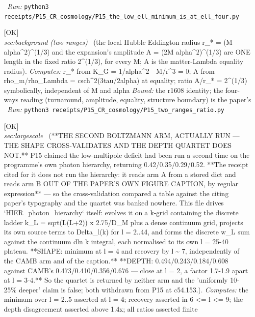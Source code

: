 \begin{description}
\ \emph{Run:} \texttt{python3 receipts/P15\_CR\_cosmology/P15\_the\_low\_ell\_minimum\_is\_at\_ell\_four.py}
\item[\label{rcpt:P15_two_ranges_ratio}\texttt{P15\_two\_ranges\_ratio}]\hfill\textsf{[OK]}\\
\textit{sec:background (two ranges)} \ (the local Hubble-Eddington radius r\_* = (M alpha\textasciicircum{}2)\textasciicircum{}(1/3) and the expansion's amplitude A = (2M alpha\textasciicircum{}2)\textasciicircum{}(1/3) are ONE length in the fixed ratio 2\textasciicircum{}(1/3), for every M; A is the matter-Lambda equality radius). 
\emph{Computes:} r\_* from K\_G = 1/alpha\textasciicircum{}2 - M/r\textasciicircum{}3 = 0; A from rho\_m/rho\_Lambda = csch\textasciicircum{}2(3tau/2alpha) at equality; ratio A/r\_* = 2\textasciicircum{}(1/3) symbolically, independent of M and alpha
 \emph{Bound:} the r1608 identity; the four-ways reading (turnaround, amplitude, equality, structure boundary) is the paper's
\ \emph{Run:} \texttt{python3 receipts/P15\_CR\_cosmology/P15\_two\_ranges\_ratio.py}
\item[\label{rcpt:P15_the_second_arm_actually_run}\texttt{P15\_the\_second\_arm\_actually\_run}]\hfill\textsf{[OK]}\\
\textit{sec:largescale} \ (**THE SECOND BOLTZMANN ARM, ACTUALLY RUN --- THE SHAPE CROSS-VALIDATES AND THE DEPTH QUARTET DOES NOT.** P15 claimed the low-multipole deficit had been run a second time on the programme's own photon hierarchy, returning 0.42/0.35/0.29/0.52. **The receipt cited for it does not run the hierarchy: it reads arm A from a stored dict and reads arm B OUT OF THE PAPER'S OWN FIGURE CAPTION, by regular expression** --- so the cross-validation compared a table against the citing paper's typography and the quartet was banked nowhere. This file drives `HIER\_photon\_hierarchy` itself: evolves it on a k-grid containing the discrete ladder k\_L = sqrt(L(L+2)) x 2.75/D\_M plus a dense continuum grid, projects its own source terms to Delta\_l(k) for l = 2..44, and forms the discrete w\_L sum against the continuum dln k integral, each normalised to its own l = 25-40 plateau. **SHAPE: minimum at l = 4 and recovery by l \textasciitilde{} 7, independently of the CAMB arm and of the caption.** **DEPTH: 0.494/0.243/0.184/0.608 against CAMB's 0.473/0.410/0.356/0.676 --- close at l = 2, a factor 1.7-1.9 apart at l = 3-4.** So the quartet is returned by neither arm and the 'uniformly 10-25\% deeper' claim is false; both withdrawn from P15 at c54.153.). 
\emph{Computes:} the minimum over l = 2..5 asserted at l = 4; recovery asserted in 6 <= l <= 9; the depth disagreement asserted above 1.4x; all ratios asserted finite

\end{description}

